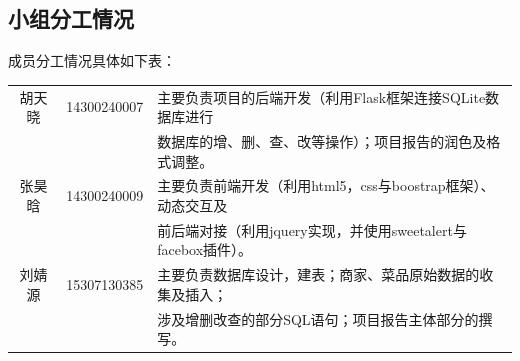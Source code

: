 \documentclass[12pt, oneside,a4paper]{article}
\begin{document}
\subsection{小组分工情况}
成员分工情况具体如下表：
\begin{table}[!h]
\begin{tabular}{|c|c|l|}
\hline
胡天晓 & 14300240007 & 主要负责项目的后端开发（利用Flask框架连接SQLite数据库进行\\
 & & 数据库的增、删、查、改等操作）；项目报告的润色及格式调整。 \\
\hline
张昊晗 & 14300240009 & 主要负责前端开发（利用html5，css与boostrap框架）、动态交互及\\
& & 前后端对接（利用jquery实现，并使用sweetalert与facebox插件）。 \\
\hline
刘婧源 & 15307130385 & 主要负责数据库设计，建表；商家、菜品原始数据的收集及插入；\\
 & & 涉及增删改查的部分SQL语句；项目报告主体部分的撰写。\\
\hline
\end{tabular}
\end{table}
\end{document}

